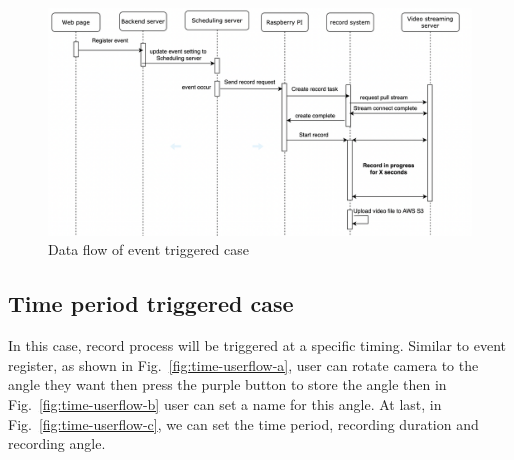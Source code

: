 \begin{figure}[H]
    \centering
    \includegraphics[width=\textwidth]{figsrc/event-sequence-diagram.png}
    \caption{Data flow of event triggered case\label{fig:event-sequence-diagram}}
\end{figure}


\subsection{Time period triggered case}
In this case, record process will be triggered at a specific timing. Similar to event register, as shown in Fig.~\ref{fig:time-userflow-a}, user can rotate camera to the angle they want then press the purple button to store the angle then in Fig.~\ref{fig:time-userflow-b} user can set a name for this angle. At last, in Fig.~\ref{fig:time-userflow-c}, we can set the time period, recording duration and recording angle.

